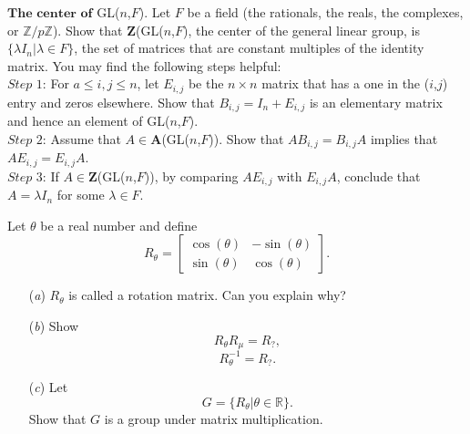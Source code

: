 \documentclass[12pt,letterpaper,boxed]{hmcpset}
\begin{document}
\begin{problem}[1.5.6]
$ \textbf{The center of} $ GL($n$,$F$). Let $F$ be a field (the rationals, the reals, the complexes, or $ \mathbb{Z}/p\mathbb{Z} $). Show that $ \textbf{Z} $(GL($n$,$F$), the center of the general linear group, is $ \{\lambda I_n \vert \lambda \in F\} $, the set of matrices that are constant multiples of the identity matrix. You may find the following steps helpful: \\
$\textit{Step 1}$: For $ a \leq i, j \leq n $, let $E_{i,j}$ be the $n \times n$ matrix that has a one in the ($i$,$j$) entry and zeros elsewhere. Show that $B_{i,j} = I_n + E_{i,j}$ is an elementary matrix and hence an element of GL($n$,$F$). \\
$\textit{Step 2}$: Assume that $ A \in \textbf{A}$(GL($n$,$F$)). Show that $AB_{i,j} = B_{i,j}A$ implies that $AE_{i,j} = E_{i,j}A$. \\
$\textit{Step 3}$: If $ A \in \textbf{Z}$(GL($n$,$F$)), by comparing $ AE_{i,j} $ with $ E_{i,j}A $, conclude that $ A = \lambda I_n $ for some $ \lambda \in F $.
\end{problem}

\begin{solution}
\end{solution}

\clearpage

\begin{problem}[2.1.2]
Let $\theta$ be a real number and define $$ R_\theta = \begin{bmatrix} \cos(\theta) & -\sin(\theta) \\ \sin(\theta) & \cos(\theta) \end{bmatrix}. $$
\begin{itemize}
  \item[(\textit{a})] $R_\theta$ is called a rotation matrix. Can you explain why?
  
  \item[(\textit{b})] Show $$ R_\theta R_\mu = R_?, $$ $$ R_\theta^{-1} = R_?. $$
  
  \item[(\textit{c})] Let $$ G = \{R_\theta \vert \theta \in \mathbb{R} \}.$$ Show that $ G $ is a group under matrix multiplication. 
\end{itemize}
\end{problem}
\begin{solution}
\end{solution}
\end{document}
